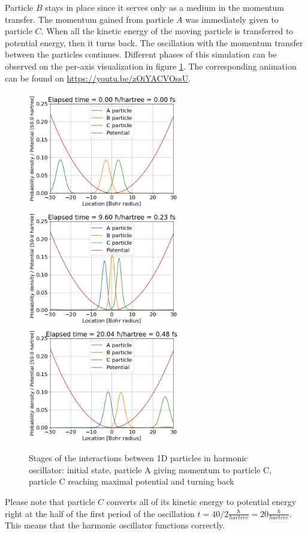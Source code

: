 Particle $B$ stays in place since it serves only as a medium in the momentum transfer.
The momentum gained from particle $A$ was immediately given to particle $C$.
When all the kinetic energy of the moving particle is transferred to potential energy, then it turns back.
The oscillation with the momentum transfer between the particles continues.
Different phases of this simulation can be observed on the per-axis visualization in figure \ref{fig:1d_particles_in_oscillator_stages}.
The corresponding animation can be found on \url{https://youtu.be/zOiYACVOssU}.
\begin{figure}
	\begin{center}
		\includegraphics[width=0.6\textwidth]{figures/1d_oscillator_01.png}
		\includegraphics[width=0.6\textwidth]{figures/1d_oscillator_02.png}
		\includegraphics[width=0.6\textwidth]{figures/1d_oscillator_03.png}
		\caption{Stages of the interactions between 1D particles in harmonic oscillator: initial state, particle A giving momentum to particle C, particle C reaching maximal potential and turning back}
		\label{fig:1d_particles_in_oscillator_stages}
	\end{center}
\end{figure}
Please note that particle $C$ converts all of its kinetic energy to potential energy right at the half of the first period of the oscillation $t = 40 / 2 \frac{\hbar}{hartree} = 20 \frac{\hbar}{hartree}$.
This means that the harmonic oscillator functions correctly.

